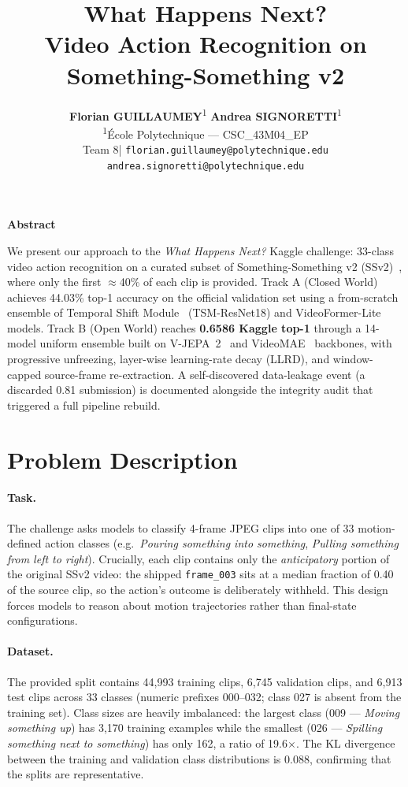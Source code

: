 \documentclass[10pt,twocolumn,letterpaper]{article}
\title{\vspace{-0.4cm}What Happens Next?\\
  Video Action Recognition on Something-Something v2}
\author{%
  \textbf{Florian GUILLAUMEY}\textsuperscript{1}\quad
  \textbf{Andrea SIGNORETTI}\textsuperscript{1}\\[2pt]
  \textsuperscript{1}École Polytechnique — CSC\_43M04\_EP\\[2pt]
  \small Team 8\quad|\quad
  \texttt{florian.guillaumey@polytechnique.edu}\quad
  \texttt{andrea.signoretti@polytechnique.edu}
}
\renewenvironment{abstract}{%
  \centerline{\large\textbf{Abstract}}\vspace{0.5em}\small}{}
\begin{document}
\maketitle
\thispagestyle{empty}

\begin{abstract}
We present our approach to the \emph{What Happens Next?} Kaggle challenge:
33-class video action recognition on a curated subset of
Something-Something v2 (SSv2)~\cite{goyal2017ssv2}, where only the first
$\approx$40\% of each clip is provided.  Track A (Closed World) achieves
44.03\% top-1 accuracy on the official validation set using a
from-scratch ensemble of Temporal Shift Module~\cite{lin2019tsm}
(TSM-ResNet18) and VideoFormer-Lite models.  Track B (Open World) reaches
\textbf{0.6586 Kaggle top-1} through a 14-model uniform ensemble built on
V-JEPA~2~\cite{bardes2025vjepa2} and VideoMAE~\cite{tong2022videomae}
backbones, with progressive unfreezing, layer-wise learning-rate decay
(LLRD), and window-capped source-frame re-extraction.  A self-discovered
data-leakage event (a discarded 0.81 submission) is documented alongside
the integrity audit that triggered a full pipeline rebuild.
\end{abstract}

\section{Problem Description}
\label{sec:problem}

\paragraph{Task.}
The challenge asks models to classify 4-frame JPEG clips into one of 33
motion-defined action classes (e.g.\ \emph{Pouring something into something},
\emph{Pulling something from left to right}).  Crucially, each clip contains
only the \emph{anticipatory} portion of the original SSv2 video: the
shipped \texttt{frame\_003} sits at a median fraction of 0.40 of the
source clip, so the action's outcome is deliberately withheld.  This
design forces models to reason about motion trajectories rather than
final-state configurations.

\paragraph{Dataset.}
The provided split contains 44{,}993 training clips, 6{,}745 validation
clips, and 6{,}913 test clips across 33 classes (numeric prefixes 000–032;
class 027 is absent from the training set).  Class sizes are heavily
imbalanced: the largest class (009 — \emph{Moving something up}) has
3{,}170 training examples while the smallest (026 — \emph{Spilling
something next to something}) has only 162, a ratio of 19.6$\times$.
The KL divergence between the training and validation class distributions
is 0.088, confirming that the splits are representative.
\end{document}
